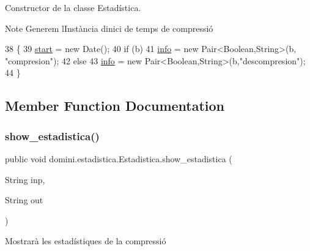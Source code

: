 Constructor de la classe Estadística. 

\begin{DoxyNote}{Note}
Generem l\textquotesingle{}Instància d\textquotesingle{}inici de temps de compressió 
\end{DoxyNote}

\begin{DoxyCode}
38                                   \{
39         \hyperlink{classdomini_1_1estadistica_1_1Estadistica_aee0ae604272563ceab4e61392cbd343e}{start} = \textcolor{keyword}{new} Date();
40         \textcolor{keywordflow}{if} (b) 
41             \hyperlink{classdomini_1_1estadistica_1_1Estadistica_a57776a71683b3717b638377073b8a99e}{info} = \textcolor{keyword}{new} Pair<Boolean,String>(b, \textcolor{stringliteral}{"compresion"});
42         \textcolor{keywordflow}{else} 
43             \hyperlink{classdomini_1_1estadistica_1_1Estadistica_a57776a71683b3717b638377073b8a99e}{info} = \textcolor{keyword}{new} Pair<Boolean,String>(b,\textcolor{stringliteral}{"descompresion"});
44     \}
\end{DoxyCode}


\subsection{Member Function Documentation}
\mbox{\label{classdomini_1_1estadistica_1_1Estadistica_a6cac6971be817fd985afb8f3b6725464}} 
\subsubsection{\texorpdfstring{show\+\_\+estadistica()}{show\_estadistica()}}
{\footnotesize\ttfamily public void domini.\+estadistica.\+Estadistica.\+show\+\_\+estadistica (\begin{DoxyParamCaption}\item[{String}]{inp,  }\item[{String}]{out }\end{DoxyParamCaption})\hspace{0.3cm}{\ttfamily [inline]}}



Mostrarà les estadístiques de la compressió 


